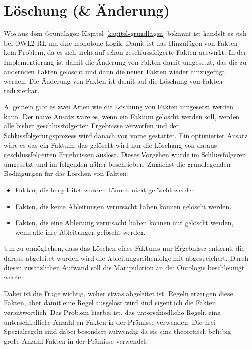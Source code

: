 \section{Löschung (\& Änderung)}

Wie aus dem Grundlagen Kapitel \ref{kapitel-grundlagen} bekannt ist handelt es sich bei OWL2 RL um eine monotone Logik. Damit ist das Hinzufügen von Fakten kein Problem, da es sich nicht auf schon geschlussfolgerte Fakten auswirkt. In der Implementierung ist damit die Änderung von Fakten damit umgesetzt, das die zu ändernden Fakten gelöscht und dann die neuen Fakten wieder hinzugefügt werden. Die Änderung von Fakten ist damit auf die Löschung von Fakten reduzierbar.

Allgemein gibt es zwei Arten wie die Löschung von Fakten umgesetzt werden kann. Der naive Ansatz wäre es, wenn ein Faktum gelöscht werden soll, werden alle bisher geschlussfolgerten Ergebnisse verworfen und der Schlussfolgerungsprozess wird danach von vorne gestartet. Ein optimierter Ansatz wäre es das ein Faktum, das gelöscht wird nur die Löschung von daraus geschlussfolgerten Ergebnissen auslöst. Dieses Vorgehen wurde im Schlussfolgerer umgesetzt und im folgenden näher beschrieben. Zunächst die grundlegenden Bedingungen für das Löschen von Fakten:

\begin{itemize}
  \item Fakten, die hergeleitet wurden können nicht gelöscht werden.
  \item Fakten, die keine Ableitungen verursacht haben können gelöscht werden.
  \item Fakten, die eine Ableitung verursacht haben können nur gelöscht werden, wenn alle ihre Ableitungen gelöscht werden.
\end{itemize}

Um zu ermöglichen, dass das Löschen eines Faktums nur Ergebnisse entfernt, die daraus abgeleitet wurden wird die Ableitungsreihenfolge mit abgespeichert. Durch diesen zusätzlichen Aufwand soll die Manipulation an der Ontologie beschleunigt werden.

Dabei ist die Frage wichtig, woher etwas abgeleitet ist. Regeln erzeugen diese Fakten, aber damit eine Regel ausgelöst wird sind eigentlich die Fakten verantwortlich. Das Problem hierbei ist, das unterschiedliche Regeln eine unterschiedliche Anzahl an Fakten in der Prämisse verwenden. Die drei Spezialregeln sind dabei besonders aufwendig da sie eine theoretisch beliebig große Anzahl Fakten in der Prämisse verwendet.


